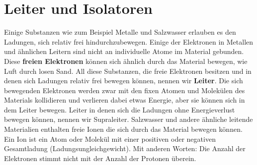 \documentclass[11pt,twoside=false,open=any]{scrbook}
\begin{document}
\begin{center}
   \setlength{\fboxrule}{2pt}
\end{center}


\chapter{Leiter und Isolatoren}

Einige Substanzen wie zum Beispiel Metalle und Salzwasser erlauben es den Ladungen, sich relativ frei hindurchzubewegen. Einige der Elektronen in Metallen und ähnlichen Leitern sind nicht an individuelle Atome im Material gebunden. Diese \textbf{freien Elektronen} können sich ähnlich durch das Material bewegen, wie Luft durch losen Sand. All diese Substanzen, die freie Elektronen besitzen und in denen sich Ladungen relativ frei bewegen können, nennen wir \textbf{Leiter}. Die sich bewegenden Elektronen werden zwar mit den fixen Atomen und Molekülen des Materials kollidieren und verlieren dabei etwas Energie, aber sie können sich in dem Leiter bewegen. Leiter in denen sich die Ladungen ohne Energieverlust bewegen können, nennen wir Supraleiter.
Salzwasser und andere ähnliche leitende Materialien enthalten freie Ionen die sich durch das Material bewegen können. Ein Ion ist ein Atom oder Molekül mit einer positiven oder negativen Gesamtladung (Ladungsungleichgewicht). Mit anderen Worten: Die Anzahl der Elektronen stimmt nicht mit der Anzahl der Protonen überein.
\end{document}
